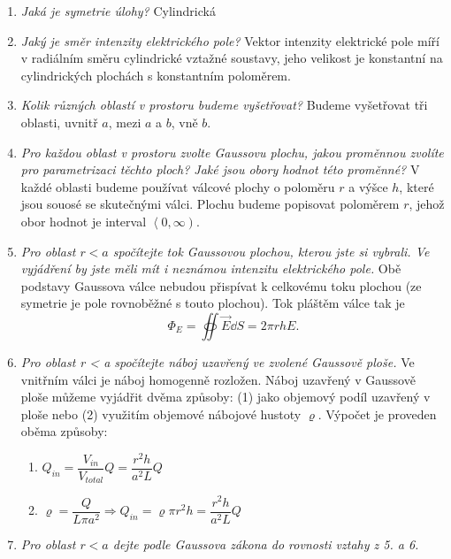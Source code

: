 \begin{mdframed}[style=mdexam]
\begin{example}
    \begin{enumerate}[noitemsep]
      \item \emph{Jaká je symetrie úlohy?} Cylindrická
      \item \emph{Jaký je směr intenzity elektrického pole?} Vektor intenzity elektrické pole míří v
            radiálním směru cylindrické vztažné soustavy, jeho velikost je konstantní na
            cylindrických plochách s konstantním poloměrem. 
      \item \emph{Kolik různých oblastí v prostoru budeme vyšetřovat?} Budeme vyšetřovat tři
             oblasti, uvnitř \(a\), mezi \(a\) a \(b\), vně \(b\).
      \item \emph{Pro každou oblast v prostoru zvolte Gaussovu plochu, jakou proměnnou zvolíte pro
            parametrizaci těchto ploch? Jaké jsou obory hodnot této proměnné?} V každé oblasti
            budeme používat válcové plochy o poloměru \(r\) a výšce \(h\), které jsou souosé se
            skutečnými válci. Plochu budeme popisovat poloměrem \(r\), jehož obor hodnot je interval
            \(\left\langle 0,\infty\right)\).
      \item \emph{Pro oblast \(r < a\) spočítejte tok Gaussovou plochou, kterou jste si vybrali. Ve
            vyjádření by jste měli mít i neznámou intenzitu elektrického pole.} Obě podstavy
            Gaussova válce nebudou přispívat k celkovému toku plochou (ze symetrie je pole
            rovnoběžné s touto plochou). Tok pláštěm válce tak je
            \begin{equation*}
              \Phi_E = \oiint\vec{E}\dd{S} = 2\pi r h E.
            \end{equation*}
            \item \emph{Pro oblast r < a spočítejte náboj uzavřený ve zvolené Gaussově ploše.}
            Ve vnitřním válci je náboj homogenně rozložen. Náboj uzavřený v Gaussově ploše můžeme
            vyjádřit dvěma způsoby: (1) jako objemový podíl uzavřený v ploše nebo (2) využitím
            objemové nábojové hustoty \(\varrho\). Výpočet je proveden oběma způsoby:
            \begin{enumerate}[noitemsep]
              \item \(Q_{in} = \dfrac{V_{in}}{V_{total}}Q = \dfrac{r^2h}{a^2L}Q\)
              \item \(\varrho = \dfrac{Q}{L\pi a^2} 
                    \Rightarrow Q_{in} = \varrho\pi r^2h = \dfrac{r^2h}{a^2L}Q\)
            \end{enumerate}
      \item \emph{Pro oblast \(r < a\) dejte podle Gaussova zákona do rovnosti vztahy z 5. a 6.
}
\end{enumerate}
\end{example}
\end{mdframed}
